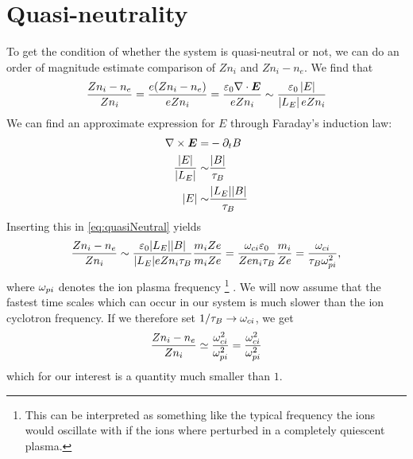 \section{Quasi-neutrality}
\label{sec:qn}
To get the condition of whether the system is quasi-neutral or not, we can do an order of magnitude estimate comparison of $Zn_i$ and $Zn_i - n_e$.
We find that
%
\begin{align}
    \frac{Zn_i - n_e}{Zn_i} =
    \frac{e(Zn_i - n_e)}{eZn_i}
    =
    \frac{\varepsilon_0\nabla\cdot\boldsymbol{E}}{eZn_i}
    \sim
    \frac{\varepsilon_0\left|E\right|}{\left|L_E\right|eZn_i}
    \label{eq:quasiNeutral}
\end{align}
%
We can find an approximate expression for $E$ through Faraday's induction law:
%
\begin{align*}
    \nabla\times\boldsymbol{E} =& -\partial_t B\\
    \frac{|E|}{|L_E|} \sim& \frac{|B|}{\tau_B}\\
    |E| \sim& \frac{|L_E||B|}{\tau_B}
\end{align*}
%
Inserting this in \cref{eq:quasiNeutral} yields
%
\begin{align*}
    \frac{Zn_i - n_e}{Zn_i}
    \sim
    \frac{\varepsilon_0 |L_E||B|}{|L_E| e Zn_i \tau_B}\frac{m_i Ze}{m_i Ze}
    =
    \frac{\omega_{ci}\varepsilon_0}{Z e n_i\tau_B}\frac{m_i}{Z e}
    =
    \frac{\omega_{ci}}{\tau_B\omega_{pi}^2},
\end{align*}
%
where $\omega_{pi}$ denotes the ion plasma frequency%
\footnote{This can be interpreted as something like the typical frequency the ions would oscillate with if the ions where perturbed in a completely quiescent plasma.}
%
.
We will now assume that the fastest time scales which can occur in our system is much slower than the ion cyclotron frequency.
If we therefore set $1/\tau_B\to\omega_{ci}$, we get
%
\begin{align}
    \frac{Zn_i - n_e}{Zn_i}
    \simeq
    \frac{\omega_{ci}^2}{\omega_{pi}^2}
    =
    \frac{\omega_{ci}^2}{\omega_{pi}^2}
    \label{eq:quasiNCompare}
\end{align}
%
which for our interest is a quantity much smaller than $1$.

